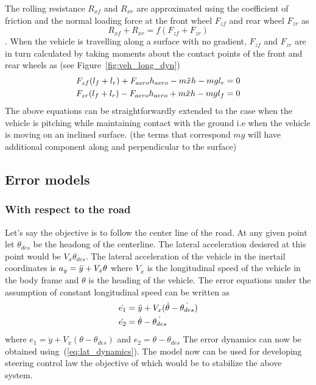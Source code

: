 The rolling resistance $R_{xf}$ and $R_{xr}$ are approximated using the coefficient of friction and the normal loading force at the front wheel $F_{zf}$ and rear wheel $F_{zr}$ as
$$R_{xf} + R_{xr} = f (F_{zf} + F_{zr})$$.
When the vehicle is travelling along a surface with no gradient, $F_{zf}$ and $F_{zr}$ are in turn calculated by taking moments about the contact points of the front and rear wheels as 
(see Figure~\ref{fig:veh_long_dyn}) 
\begin{align}
    F_{zf}(l_f+l_r) + F_{aero}h_{aero} -m\Ddot{x}h - mgl_r &= 0 \\
    F_{zr}(l_f+l_r) - F_{aero}h_{aero} +m\Ddot{x}h - mgl_f &= 0 
\end{align}
The above equations can be straightforwardly extended to the case when the vehicle is pitching while maintaining contact with the ground i.e when the vehicle is moving on an inclined surface. (the terms that correspond $mg$ will have additional component along and perpendicular to the surface)
\subsection{Error models}
\subsubsection{With respect to the road}
Let's say the objective is to follow the center line of the road. At any given point let $\theta_{des}$ be the headong of the centerline. The lateral acceleration desisred at this point would be $V_x\theta_{des}$. The lateral acceleration of the vehicle in the inertail coordinates is $a_y = \Ddot{y} + V_x\theta$ where $V_x$ is the longitudinal speed of the vehicle in the body frame and $\theta$ is the heading of the vehicle. The error equations under the assumption of constant longitudinal speed can be written as
\begin{align}
    \dot{e_1} &= \Ddot{y} + V_x(\dot{\theta} - \dot{\theta_{des}}) \\
    \dot{e_2} & = \dot{\theta} - \dot{\theta_{des}}
\end{align}
where $e_1 = \dot{y} + V_x(\theta - \theta_{des})$ and $e_2 = \theta - \theta_{des}$
The error dynamics can now be obtained using~(\ref{eq:lat_dynamics}). The model now can be used for developing steering control law the objective of which would be to stabilize the above system.

